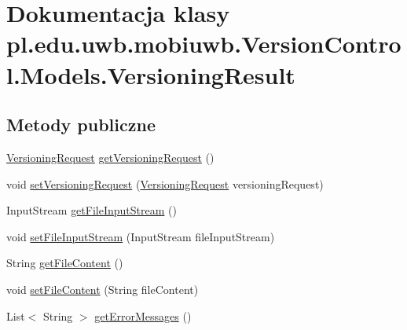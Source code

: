 \hypertarget{classpl_1_1edu_1_1uwb_1_1mobiuwb_1_1_version_control_1_1_models_1_1_versioning_result}{}\section{Dokumentacja klasy pl.\+edu.\+uwb.\+mobiuwb.\+Version\+Control.\+Models.\+Versioning\+Result}
\label{classpl_1_1edu_1_1uwb_1_1mobiuwb_1_1_version_control_1_1_models_1_1_versioning_result}
\subsection*{Metody publiczne}
\begin{DoxyCompactItemize}
\item 
\hyperlink{classpl_1_1edu_1_1uwb_1_1mobiuwb_1_1_version_control_1_1_models_1_1_versioning_request}{Versioning\+Request} \hyperlink{classpl_1_1edu_1_1uwb_1_1mobiuwb_1_1_version_control_1_1_models_1_1_versioning_result_abb9c1e1796e7d14dbe50c8f8d8a39c3e}{get\+Versioning\+Request} ()
\item 
void \hyperlink{classpl_1_1edu_1_1uwb_1_1mobiuwb_1_1_version_control_1_1_models_1_1_versioning_result_a0c93fbd870a3b89c8afc3a60a6208267}{set\+Versioning\+Request} (\hyperlink{classpl_1_1edu_1_1uwb_1_1mobiuwb_1_1_version_control_1_1_models_1_1_versioning_request}{Versioning\+Request} versioning\+Request)
\item 
Input\+Stream \hyperlink{classpl_1_1edu_1_1uwb_1_1mobiuwb_1_1_version_control_1_1_models_1_1_versioning_result_aa407c384e5fe1ff6b36e673c8873c0aa}{get\+File\+Input\+Stream} ()
\item 
void \hyperlink{classpl_1_1edu_1_1uwb_1_1mobiuwb_1_1_version_control_1_1_models_1_1_versioning_result_a2605aee12373d6efe784df67ea5d4432}{set\+File\+Input\+Stream} (Input\+Stream file\+Input\+Stream)
\item 
String \hyperlink{classpl_1_1edu_1_1uwb_1_1mobiuwb_1_1_version_control_1_1_models_1_1_versioning_result_a5ba8c8f48195df7e9a706c96f3053003}{get\+File\+Content} ()
\item 
void \hyperlink{classpl_1_1edu_1_1uwb_1_1mobiuwb_1_1_version_control_1_1_models_1_1_versioning_result_af505b4fd44cc8e18a4793c7ba09a5361}{set\+File\+Content} (String file\+Content)
\item 
List$<$ String $>$ \hyperlink{classpl_1_1edu_1_1uwb_1_1mobiuwb_1_1_version_control_1_1_models_1_1_versioning_result_ac73e38e92dcda2c63926c63a3f5a8b3c}{get\+Error\+Messages} ()

\end{DoxyCompactItemize}

